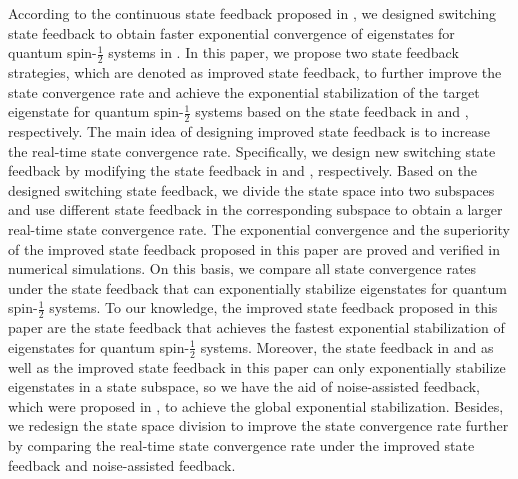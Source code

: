 \documentclass[]{elsarticle}
\begin{document}
According to the continuous state feedback proposed in \cite{LAMC2018}, we designed switching state feedback to obtain faster exponential convergence of eigenstates for quantum spin-$\frac{1}{2}$ systems in \cite{WSJZJ2021b}. In this paper, we propose two state feedback strategies, which are denoted as improved state feedback, to further improve the state convergence rate and achieve the exponential stabilization of the target eigenstate for quantum spin-$\frac{1}{2}$ systems based on the state feedback in \cite{LAMC2018} and \cite{WSJZJ2021b}, respectively. The main idea of designing improved state feedback is to increase the real-time state convergence rate. Specifically, we design new switching state feedback by modifying the state feedback in \cite{LAMC2018} and \cite{WSJZJ2021b}, respectively. Based on the designed switching state feedback, we divide the state space into two subspaces and use different state feedback in the corresponding subspace to obtain a larger real-time state convergence rate. The exponential convergence and the superiority of the  improved state feedback proposed in this paper are proved and verified in numerical simulations. On this basis, we compare all state convergence rates under the state feedback that can exponentially stabilize eigenstates for quantum spin-$\frac{1}{2}$ systems. To our knowledge, the improved state feedback proposed in this paper are the state feedback that achieves the fastest exponential stabilization of eigenstates for quantum spin-$\frac{1}{2}$ systems. Moreover, the state feedback in \cite{LAMC2018} and \cite{WSJZJ2021b} as well as the improved state feedback in this paper can only exponentially stabilize eigenstates in a state subspace, so we have the aid of noise-assisted feedback, which were proposed in \cite{WSJZJ2021}, to achieve the global exponential stabilization. Besides, we redesign the state space division to improve the state convergence rate further by comparing the real-time state convergence rate under the improved state feedback and noise-assisted feedback. 
\end{document}
